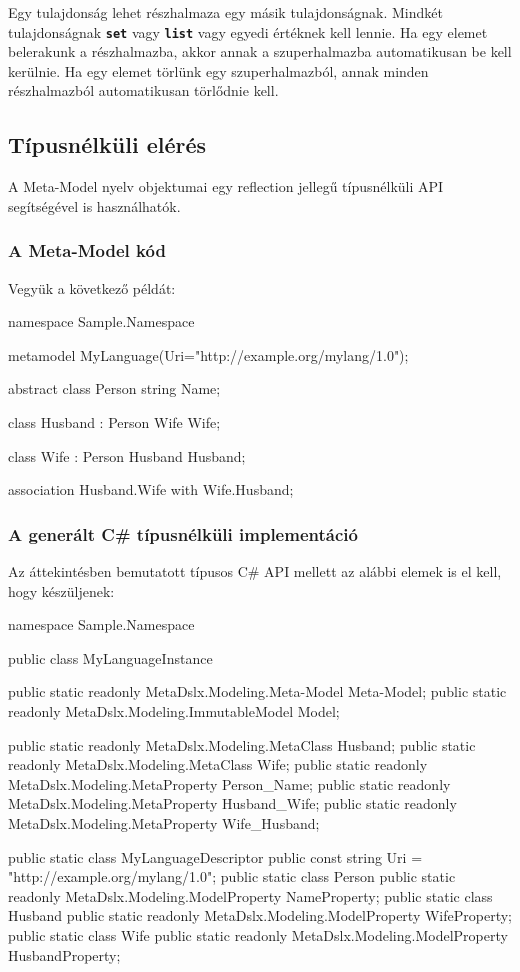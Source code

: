 \documentclass[12pt, a4paper]{report}
\newcommand{\ff}[1]{\textbf{\texttt{#1}}}
\begin{document}
Egy tulajdonság lehet részhalmaza egy másik tulajdonságnak. Mindkét tulajdonságnak \ff{set} vagy \ff{list} vagy egyedi értéknek kell lennie. Ha egy elemet belerakunk a részhalmazba, akkor annak a szuperhalmazba automatikusan be kell kerülnie. Ha egy elemet törlünk egy szuperhalmazból, annak minden részhalmazból automatikusan törlődnie kell.

\subsection{Típusnélküli elérés}

A Meta-Model nyelv objektumai egy reflection jellegű típusnélküli API segítségével is használhatók.

\subsubsection{A Meta-Model kód}

Vegyük a következő példát:

\begin{mmcode}
namespace Sample.Namespace
{
	metamodel MyLanguage(Uri="http://example.org/mylang/1.0"); 
	
	abstract class Person
	{
		string Name;
	}
	
	class Husband : Person
	{
		Wife Wife;
	}
	
	class Wife : Person
	{
		Husband Husband;
	}
	
	association Husband.Wife with Wife.Husband;
}
\end{mmcode}

\subsubsection{A generált C\# típusnélküli implementáció}

Az áttekintésben bemutatott típusos C\# API mellett az alábbi elemek is el kell, hogy készüljenek:

\begin{mmcode}
namespace Sample.Namespace
{
	public class MyLanguageInstance
	{
		public static readonly MetaDslx.Modeling.Meta-Model Meta-Model;
		public static readonly MetaDslx.Modeling.ImmutableModel Model;
		
		public static readonly MetaDslx.Modeling.MetaClass Husband;
		public static readonly MetaDslx.Modeling.MetaClass Wife;
		public static readonly MetaDslx.Modeling.MetaProperty Person_Name;
		public static readonly MetaDslx.Modeling.MetaProperty Husband_Wife;
		public static readonly MetaDslx.Modeling.MetaProperty Wife_Husband;
	}
	
	public static class MyLanguageDescriptor
	{
		public const string Uri = "http://example.org/mylang/1.0";
		public static class Person
		{
			public static readonly MetaDslx.Modeling.ModelProperty NameProperty;
		}
		public static class Husband
		{
			public static readonly MetaDslx.Modeling.ModelProperty WifeProperty;
		}
		public static class Wife
		{
			public static readonly MetaDslx.Modeling.ModelProperty HusbandProperty;
		}
	}
}
\end{mmcode}
\end{document}
